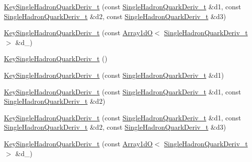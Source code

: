 \begin{DoxyCompactItemize}
\item 
\mbox{\hyperlink{structHadron_1_1KeySingleHadronQuarkDeriv__t_a228d03db64fbe8db5371d92e4fb3806e}{Key\+Single\+Hadron\+Quark\+Deriv\+\_\+t}} (const \mbox{\hyperlink{structHadron_1_1SingleHadronQuarkDeriv__t}{Single\+Hadron\+Quark\+Deriv\+\_\+t}} \&d1, const \mbox{\hyperlink{structHadron_1_1SingleHadronQuarkDeriv__t}{Single\+Hadron\+Quark\+Deriv\+\_\+t}} \&d2, const \mbox{\hyperlink{structHadron_1_1SingleHadronQuarkDeriv__t}{Single\+Hadron\+Quark\+Deriv\+\_\+t}} \&d3)
\item 
\mbox{\hyperlink{structHadron_1_1KeySingleHadronQuarkDeriv__t_a35ce6c87867b7b8938820f4869b3f91c}{Key\+Single\+Hadron\+Quark\+Deriv\+\_\+t}} (const \mbox{\hyperlink{classADAT_1_1Array1dO}{Array1dO}}$<$ \mbox{\hyperlink{structHadron_1_1SingleHadronQuarkDeriv__t}{Single\+Hadron\+Quark\+Deriv\+\_\+t}} $>$ \&d\+\_\+)
\item 
\mbox{\hyperlink{structHadron_1_1KeySingleHadronQuarkDeriv__t_a0f700137eb8da25f983d2fe6cf1b4576}{Key\+Single\+Hadron\+Quark\+Deriv\+\_\+t}} ()
\item 
\mbox{\hyperlink{structHadron_1_1KeySingleHadronQuarkDeriv__t_aa5c8f28f9618d243cca0dc7b1be6ed59}{Key\+Single\+Hadron\+Quark\+Deriv\+\_\+t}} (const \mbox{\hyperlink{structHadron_1_1SingleHadronQuarkDeriv__t}{Single\+Hadron\+Quark\+Deriv\+\_\+t}} \&d1)
\item 
\mbox{\hyperlink{structHadron_1_1KeySingleHadronQuarkDeriv__t_ae44429f98ae01120f81174b6899a8b13}{Key\+Single\+Hadron\+Quark\+Deriv\+\_\+t}} (const \mbox{\hyperlink{structHadron_1_1SingleHadronQuarkDeriv__t}{Single\+Hadron\+Quark\+Deriv\+\_\+t}} \&d1, const \mbox{\hyperlink{structHadron_1_1SingleHadronQuarkDeriv__t}{Single\+Hadron\+Quark\+Deriv\+\_\+t}} \&d2)
\item 
\mbox{\hyperlink{structHadron_1_1KeySingleHadronQuarkDeriv__t_a228d03db64fbe8db5371d92e4fb3806e}{Key\+Single\+Hadron\+Quark\+Deriv\+\_\+t}} (const \mbox{\hyperlink{structHadron_1_1SingleHadronQuarkDeriv__t}{Single\+Hadron\+Quark\+Deriv\+\_\+t}} \&d1, const \mbox{\hyperlink{structHadron_1_1SingleHadronQuarkDeriv__t}{Single\+Hadron\+Quark\+Deriv\+\_\+t}} \&d2, const \mbox{\hyperlink{structHadron_1_1SingleHadronQuarkDeriv__t}{Single\+Hadron\+Quark\+Deriv\+\_\+t}} \&d3)
\item 
\mbox{\hyperlink{structHadron_1_1KeySingleHadronQuarkDeriv__t_a35ce6c87867b7b8938820f4869b3f91c}{Key\+Single\+Hadron\+Quark\+Deriv\+\_\+t}} (const \mbox{\hyperlink{classADAT_1_1Array1dO}{Array1dO}}$<$ \mbox{\hyperlink{structHadron_1_1SingleHadronQuarkDeriv__t}{Single\+Hadron\+Quark\+Deriv\+\_\+t}} $>$ \&d\+\_\+)
\end{DoxyCompactItemize}
